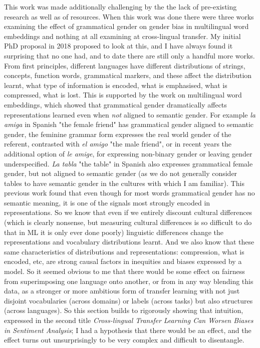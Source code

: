 This work was made additionally challenging by the the lack of pre-existing research as well as of resources. When this work was done there were three works examining the effect of grammatical gender on gender bias in multilingual word embeddings \citep{} and nothing at all examining at cross-lingual transfer. My initial PhD proposal in 2018 proposed to look at this, and I have always found it surprising that no one had, and to date there are still only a handful more works. From first principles, different languages have different distributions of strings, concepts, function words, grammatical markers, and these affect the distribution learnt, what type of information is encoded, what is emphasised, what is compressed, what is lost. This is supported by the work on multilingual word embeddings, which showed that grammatical gender dramatically affects representations learned even when \textit{not} aligned to semantic gender. For example \textit{la amiga} in Spanish "the female friend" has grammatical gender aligned to semantic gender, the feminine grammar form expresses the real world gender of the referent, contrasted with \textit{el amigo} "the male friend", or in recent years the additional option of \textit{le amige}, for expressing non-binary gender or leaving gender underspecified. \textit{La tabla} "the table" in Spanish also expresses grammatical female gender, but not aligned to semantic gender (as we do not generally consider tables to have semantic gender in the cultures with which I am familiar)\citep{corbett? grammar chapter}. This previous work found that even though for most words grammatical gender has no semantic meaning, it is one of the signals most strongly encoded in representations. So we know that even if we entirely discount cultural differences (which is clearly nonsense, but measuring cultural differences is so difficult to do that in ML it is only ever done poorly) linguistic differences change the representations and vocabulary distributions learnt. And we also know that these same characteristics of distributions and representations: compression, what is encoded, etc, are strong causal factors in inequities and biases expressed by a model. So it seemed obvious to me that there would be some effect on fairness from superimposing one language onto another, or from in any way blending this data, as a stronger or more ambitious form of transfer learning with not just disjoint vocabularies (across domains) or labels (across tasks) but also structures (across languages). So this section builds to rigorously showing that intuition, expressed in the second title \textit{Cross-lingual Transfer Learning Can Worsen Biases in Sentiment Analysis}; I had a hypothesis that there would be an effect, and the effect turns out unsurprisingly to be very complex and difficult to disentangle. 


